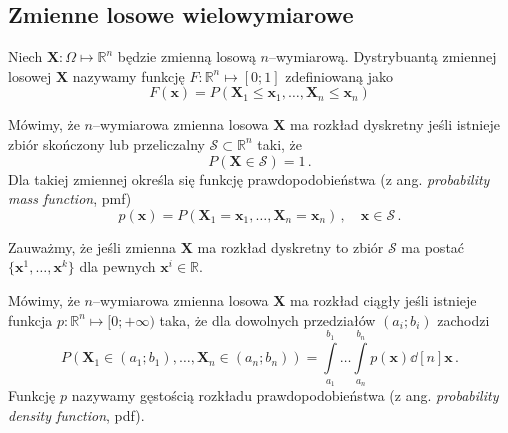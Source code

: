 \documentclass{myclass}
\numberwithin{equation}{subsection}
\begin{document}
\subsection{Zmienne losowe wielowymiarowe}

\begin{definition}
Niech \(\mathbf{X}: \Omega \mapsto \mathbb{R}^n\) będzie zmienną losową \(n\)--wymiarową.
Dystrybuantą zmiennej losowej \(\mathbf{X}\) nazywamy funkcję \(F: \mathbb{R}^n \mapsto [0;1]\)
zdefiniowaną jako
\begin{equation*}
    F(\mathbf{x}) = P(\mathbf{X}_1 \leq \mathbf{x}_1, \ldots, \mathbf{X}_n \leq \mathbf{x}_n)
\end{equation*}
\end{definition}

\begin{definition}
Mówimy, że \(n\)--wymiarowa zmienna losowa \(\mathbf{X}\) ma rozkład dyskretny jeśli istnieje zbiór
skończony lub przeliczalny \(\mathcal{S} \subset \mathbb{R}^n\) taki, że
\begin{equation*}
    P(\mathbf{X} \in \mathcal{S}) = 1\,.
\end{equation*}
Dla takiej zmiennej określa się funkcję prawdopodobieństwa (z ang. \textit{probability mass
function}, pmf)
\begin{equation*}
    p(\mathbf{x}) = P(\mathbf{X}_1 = \mathbf{x}_1, \ldots, \mathbf{X}_n = \mathbf{x}_n)\,,\quad \mathbf{x} \in \mathcal{S}\,.
\end{equation*}
\end{definition}

Zauważmy, że jeśli zmienna \(\mathbf{X}\) ma rozkład dyskretny to zbiór \(\mathcal{S}\) ma postać
\(\{\mathbf{x}^1,\ldots,\mathbf{x}^k\}\) dla pewnych \(\mathbf{x}^i \in \mathbb{R}\).

\begin{definition}
Mówimy, że \(n\)--wymiarowa zmienna losowa \(\mathbf{X}\) ma rozkład ciągły jeśli istnieje funkcja
\(p: \mathbb{R}^n \mapsto [0;+\infty)\) taka, że dla dowolnych przedziałów \((a_i;b_i)\) zachodzi
\begin{equation*}
    P(\mathbf{X}_1 \in (a_1;b_1), \ldots, \mathbf{X}_n \in (a_n;b_n)) = \int\limits_{a_1}^{b_1}\ldots\int\limits_{a_n}^{b_n}p(\mathbf{x}) \dd[n]{\mathbf{x}}\,.
\end{equation*}
Funkcję \(p\) nazywamy gęstością rozkładu prawdopodobieństwa (z ang. \textit{probability density
function}, pdf).
\end{definition}
\end{document}
